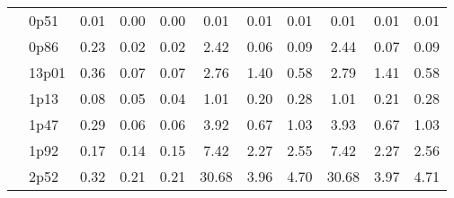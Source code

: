 \documentclass[12pt,A4paper]{article}
\begin{document}
\begin{table}[]
\begin{tabular}{lllllllllll}
\multicolumn{1}{|l|}{} & \multicolumn{1}{l|}{0p51} & \multicolumn{1}{c|}{0.01}        & \multicolumn{1}{c|}{0.00}         & \multicolumn{1}{c|}{0.00}        & \multicolumn{1}{c|}{0.01}         & \multicolumn{1}{c|}{0.01}        & \multicolumn{1}{c|}{0.01}        & \multicolumn{1}{c|}{0.01}        & \multicolumn{1}{c|}{0.01}        & \multicolumn{1}{c|}{0.01}         \\ \cline{2-11}
\multicolumn{1}{|l|}{} & \multicolumn{1}{l|}{0p86} & \multicolumn{1}{c|}{0.23}        & \multicolumn{1}{c|}{0.02}         & \multicolumn{1}{c|}{0.02}        & \multicolumn{1}{c|}{2.42}         & \multicolumn{1}{c|}{0.06}        & \multicolumn{1}{c|}{0.09}        & \multicolumn{1}{c|}{2.44}        & \multicolumn{1}{c|}{0.07}        & \multicolumn{1}{c|}{0.09}         \\ \cline{2-11}
\multicolumn{1}{|l|}{} & \multicolumn{1}{l|}{13p01} & \multicolumn{1}{c|}{0.36}        & \multicolumn{1}{c|}{0.07}         & \multicolumn{1}{c|}{0.07}        & \multicolumn{1}{c|}{2.76}         & \multicolumn{1}{c|}{1.40}        & \multicolumn{1}{c|}{0.58}        & \multicolumn{1}{c|}{2.79}        & \multicolumn{1}{c|}{1.41}        & \multicolumn{1}{c|}{0.58}         \\ \cline{2-11}
\multicolumn{1}{|l|}{} & \multicolumn{1}{l|}{1p13} & \multicolumn{1}{c|}{0.08}        & \multicolumn{1}{c|}{0.05}         & \multicolumn{1}{c|}{0.04}        & \multicolumn{1}{c|}{1.01}         & \multicolumn{1}{c|}{0.20}        & \multicolumn{1}{c|}{0.28}        & \multicolumn{1}{c|}{1.01}        & \multicolumn{1}{c|}{0.21}        & \multicolumn{1}{c|}{0.28}         \\ \cline{2-11}
\multicolumn{1}{|l|}{} & \multicolumn{1}{l|}{1p47} & \multicolumn{1}{c|}{0.29}        & \multicolumn{1}{c|}{0.06}         & \multicolumn{1}{c|}{0.06}        & \multicolumn{1}{c|}{3.92}         & \multicolumn{1}{c|}{0.67}        & \multicolumn{1}{c|}{1.03}        & \multicolumn{1}{c|}{3.93}        & \multicolumn{1}{c|}{0.67}        & \multicolumn{1}{c|}{1.03}         \\ \cline{2-11}
\multicolumn{1}{|l|}{} & \multicolumn{1}{l|}{1p92} & \multicolumn{1}{c|}{0.17}        & \multicolumn{1}{c|}{0.14}         & \multicolumn{1}{c|}{0.15}        & \multicolumn{1}{c|}{7.42}         & \multicolumn{1}{c|}{2.27}        & \multicolumn{1}{c|}{2.55}        & \multicolumn{1}{c|}{7.42}        & \multicolumn{1}{c|}{2.27}        & \multicolumn{1}{c|}{2.56}         \\ \cline{2-11}
\multicolumn{1}{|l|}{} & \multicolumn{1}{l|}{2p52} & \multicolumn{1}{c|}{0.32}        & \multicolumn{1}{c|}{0.21}         & \multicolumn{1}{c|}{0.21}        & \multicolumn{1}{c|}{30.68}         & \multicolumn{1}{c|}{3.96}        & \multicolumn{1}{c|}{4.70}        & \multicolumn{1}{c|}{30.68}        & \multicolumn{1}{c|}{3.97}        & \multicolumn{1}{c|}{4.71}         \\ \cline{2-11}

\end{tabular}
\end{table}
\end{document}
